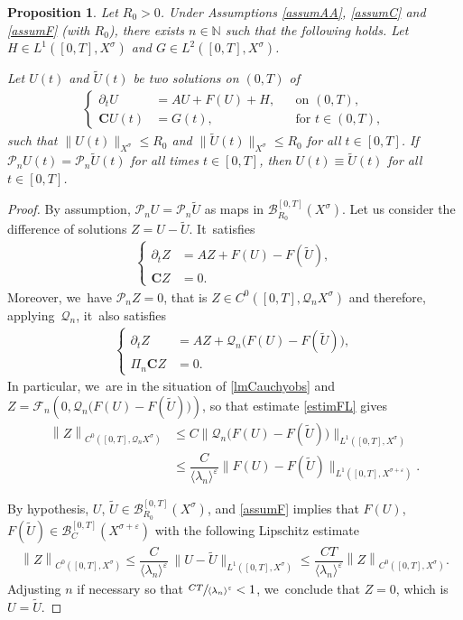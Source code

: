 \documentclass[JEP,XML,SOM,Unicode,published]{cedram}
\newcommand\bnor[2]{\bigl\|#1\bigr\|_{#2}}%
\newtheorem{proposition}[theorem]{Proposition}
\theoremstyle{definition}
\let\mc\mathcal
\let\ld\lambda
\let\veps\varepsilon
\newcommand{\B}{\mc{B}}
\newcommand{\N}{\mathbb{N}}
\newcommand{\Q}{\mathcal{Q}}
\renewcommand{\P}{\mathcal{P}}
\newcommand{\bC}{\boldsymbol{C}}
\providecommand{\norm}[1]{\lVert#1\rVert}
\providecommand{\inn}[1]{\langle#1\rangle}
\newcommand\nor[2]{\left\|#1\right\|_{#2}}
\newcommand\FL{\mathcal{F}_{n}}
\begin{document}
\begin{proposition}\label{prop:finite-det-modes}
Let $R_{0}>0$. Under Assumptions \ref{assumAA}, \ref{assumC} and \ref{assumF} (with $R_{0}$), there exists $n\in \N$ such that the following holds. Let $H\in L^1([0,T],X^{\sigma})$ and $G\in L^2([0, T], X^\sigma)$.

Let $U(t)$ and $\widetilde{U}(t)$ be two solutions on $(0,T)$ of
\begin{align*}
\left\{\begin{aligned}
\partial_t U&=AU+F(U)+H, &&\text{on } (0, T), \\
\bC U(t)&=G(t), && \text{for } t\in (0, T),
\end{aligned}\right.
\end{align*}
such that $\norm{U(t)}_{X^\sigma}\leq R_{0}$ and $\norm{\widetilde{U}(t)}_{X^\sigma}\leq R_{0}$ for all $t\in [0, T]$. If $\P_n U(t)=\P_n \widetilde{U}(t)$ for all times $t\in [0, T]$, then $U(t)\equiv \widetilde{U}(t)$ for all $t\in [0, T]$.
\end{proposition}
\begin{proof}
By assumption, $\P_{n}U=\P_{n}\widetilde{U}$ as maps in $\B_{R_{0}}^{[0,T]}(X^{\sigma})$. Let us consider the difference of solutions $Z=U-\widetilde{U}$. It~satisfies
\begin{align*}
\left\{\begin{aligned}
\partial_t Z&=AZ+F(U)-F(\widetilde{U}), \\
\bC Z&=0.
\end{aligned}\right.
\end{align*}
Moreover, we~have $\P_n Z=0$, that is $Z\in C^{0}([0,T],\Q_{n}X^{\sigma})$ and therefore, applying~$\Q_n$, it~also satisfies
\begin{align*}
\left\{\begin{aligned}
\partial_t Z&=AZ+\Q_n \bigl(F(U)-F(\widetilde{U})\bigr), \\
\Pi_{n}\bC Z&=0.
\end{aligned}\right.
\end{align*}
In particular, we~are in the situation of \cref{lmCauchyobs} and $Z=\FL(0,\Q_n \big(F(U)-F(\widetilde{U})\big))$, so that estimate \eqref{estimFL} gives
\begin{align*}
\nor{Z}{C^{0}([0,T],\Q_{n}X^{\sigma})}&\leq C \bnor{\Q_n \bigl(F(U)-F(\widetilde{U})\bigr)}{L^{1}([0,T],X^{\sigma})}\\
&\leq \dfrac{C}{\inn{\ld_n}^\veps} \bnor{F(U)-F(\widetilde{U})}{L^{1}([0,T],X^{\sigma+\veps})}.
\end{align*}

By hypothesis, $U$, $\widetilde{U}\in \B_{R_0}^{[0, T]}(X^\sigma)$, and \cref{assumF} implies that $F(U)$, $F(\widetilde{U})\in \B_{C}^{[0,T]}(X^{\sigma+\veps})$ with the following Lipschitz estimate
\begin{align*}
\nor{Z}{C^{0}([0,T],X^{\sigma})}\leq \dfrac{C}{\inn{\ld_n}^\veps}\, \bnor{U-\widetilde{U}}{L^{1}([0,T],X^{\sigma})}\leq \dfrac{CT}{\inn{\ld_n}^\veps} \nor{Z}{C^{0}([0,T],X^{\sigma})}.
\end{align*}
Adjusting $n$ if necessary so that $\sfrac{CT}{\inn{\ld_n}^\veps}<1$, we~conclude that $Z=0$, which is $U= \widetilde{U}$.
\end{proof}
\end{document}
